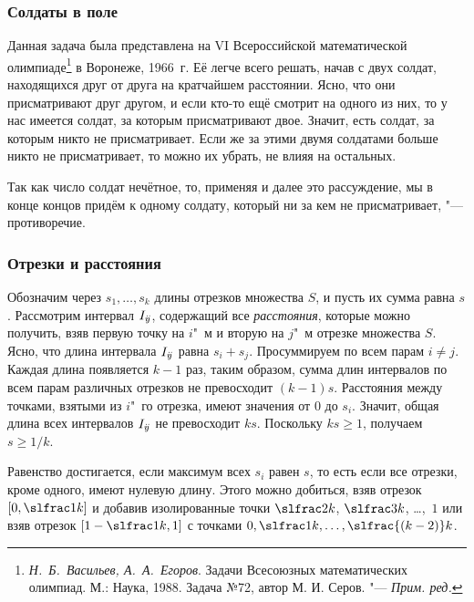 \documentclass[twoside]{book}
\newcommand\VsMO{\emph{Н.~Б.~Васильев, А.~А.~Егоров}. Задачи Всесоюзных математических олимпиад. М.: Наука, 1988}
\begin{document}
\subsubsection*{Солдаты в поле}%
Данная задача была представлена на VI Всероссийской математической олимпиаде\footnote{%
\VsMO. Задача №72, автор М. И. Серов. "--- \emph{Прим. ред.}} в Воронеже, 1966~г.
Её легче всего решать, начав с двух солдат, находящихся друг от друга на кратчайшем расстоянии.
Ясно, что они присматривают друг другом, и если кто-то ещё смотрит на одного из них, то у нас имеется солдат, за которым присматривают двое. 
Значит, есть солдат, за которым никто не присматривает.
Если же за этими двумя солдатами больше никто не присматривает, то можно их убрать, не влияя на остальных.
{\par}

Так как число солдат нечётное, то, применяя и далее это рассуждение, мы в конце концов придём к одному солдату, который ни за кем не присматривает, "--- противоречие.\heart

\subsubsection*{Отрезки и расстояния} %

Обозначим через $s_1,\dots,s_k$ длины отрезков множества $S$,
и пусть их сумма равна $s$.
Рассмотрим интервал $I_{i\mkern-4mu j}$, содержащий все \emph{расстояния}, которые можно получить, взяв первую точку на $i$"~м и вторую на $j$"~м отрезке множества $S$.
Ясно, что длина интервала $I_{i\mkern-4mu j}$ равна $s_i+s_j$.
Просуммируем по всем парам $i\ne j$. Каждая длина появляется $k-1$ раз,
таким образом, сумма длин интервалов по всем парам различных отрезков не превосходит $(k-1) s$.
Расстояния между точками, взятыми из $i$"~го отрезка, имеют значения от $0$ до $s_i$.
Значит, общая длина всех интервалов $I_{i\mkern-4mu j}$ не превосходит $k s$.
Поскольку $k s\ge 1$, получаем $s\ge 1/k$.
\heart

\medskip
Равенство достигается, если максимум всех $s_i$ равен $s$, 
то есть если все отрезки, кроме одного, имеют нулевую длину.
Этого можно добиться, взяв отрезок $[0,\slfrac1k]$ и добавив изолированные точки
$\slfrac2k$, $\slfrac3k$, \dots,~$1$ или взяв отрезок $[1-\slfrac1k,1]$ с точками
$0,\slfrac1k,\dots,\slfrac{(k-2)}k$. %
\end{document}
